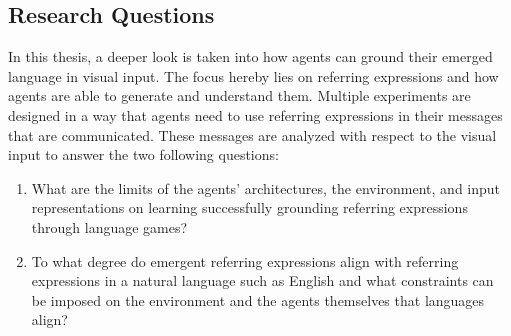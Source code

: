 \subsection{Research Questions}
In this thesis, a deeper look is taken into how agents can ground their emerged language in visual input.
The focus hereby lies on referring expressions and how agents are able to generate and understand them.
Multiple experiments are designed in a way that agents need to use referring expressions in their messages that are communicated.
These messages are analyzed with respect to the visual input to answer the two following questions:
\begin{enumerate}
      \item What are the limits of the agents' architectures, the environment, and input representations on learning successfully grounding referring expressions through language games?
      \item To what degree do emergent referring expressions align with referring expressions in a natural language such as English and what constraints can be imposed on the environment and the agents themselves that languages align?
\end{enumerate}


